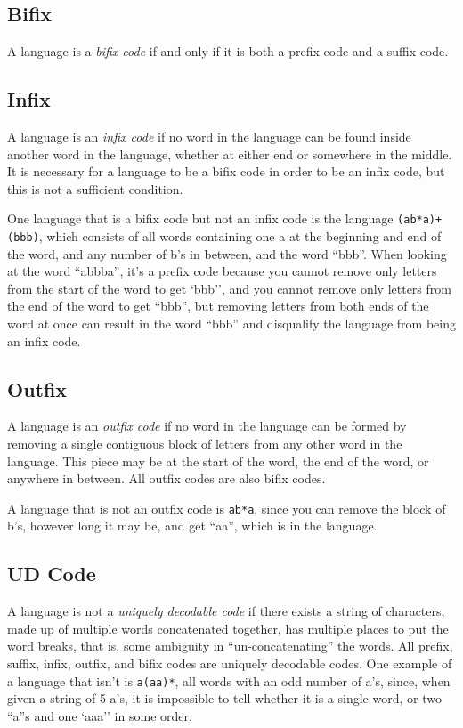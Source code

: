 \documentclass{article}
\begin{document}
\subsection{Bifix}
A language is a \textit{bifix code} if and only if it is both a prefix code and a suffix code.

\subsection{Infix}
A language is an \textit{infix code} if no word in the language can be found inside another word in the language, whether at either end or somewhere in the middle. It is necessary for a language to be a bifix code in order to be an infix code, but this is not a sufficient condition.

\par One language that is a bifix code but not an infix code is the language \verb-(ab*a)+(bbb)-, which consists of all words containing one a at the beginning and end of the word, and any number of b's in between, and the word ``bbb''.
When looking at the word ``abbba'', it's a prefix code because you cannot remove only letters from the start of the word to get `bbb'', and you cannot remove only letters from the end of the word to get ``bbb'', but removing letters from both ends of the word at once can result in the word ``bbb'' and disqualify the language from being an infix code.

\subsection{Outfix}
A language is an \textit{outfix code} if no word in the language can be formed by removing a single contiguous block of letters from any other word in the language. This piece may be at the start of the word, the end of the word, or anywhere in between. All outfix codes are also bifix codes.
\par A language that is not an outfix code is \verb-ab*a-, since you can remove the block of b's, however long it may be, and get ``aa'', which is in the language.

\subsection{UD Code}
A language is not a \textit{uniquely decodable code} if there exists a string of characters, made up of multiple words concatenated together, has multiple places to put the word breaks, that is, some ambiguity in ``un-concatenating'' the words. All prefix, suffix, infix, outfix, and bifix codes are uniquely decodable codes. One example of a language that isn't is \verb-a(aa)*-, all words with an odd number of a's, since, when given a string of 5 a's, it is impossible to tell whether it is a single word, or two ``a''s and one `aaa'' in some order.
\end{document}
